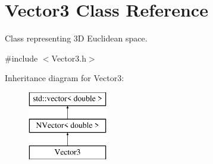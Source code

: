 \hypertarget{class_vector3}{}\section{Vector3 Class Reference}
\label{class_vector3}


Class representing 3D Euclidean space.  




{\ttfamily \#include $<$Vector3.\+h$>$}

Inheritance diagram for Vector3\+:\begin{figure}[H]
\begin{center}
\leavevmode
\includegraphics[height=3.000000cm]{class_vector3}
\end{center}
\end{figure}
